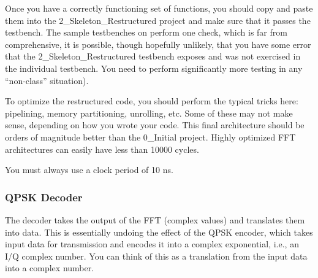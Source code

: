 \documentclass[a4paper,12pt,twoside]{article}
\begin{document}
Once you have a correctly functioning set of functions, you should copy and paste them into the 2\_Skeleton\_Restructured project and make sure that it passes the testbench. The sample testbenches on perform one check, which is far from comprehensive, it is possible, though hopefully unlikely, that you have some error that the 2\_Skeleton\_Restructured testbench exposes and was not exercised in the individual testbench. You need to perform significantly more testing in any “non-class” situation).

To optimize the restructured code, you should perform the typical tricks here: pipelining, memory partitioning, unrolling, etc. Some of these may not make sense, depending on how you wrote your code. This final architecture should be orders of magnitude better than the 0\_Initial project. Highly optimized FFT architectures can easily have less than 10000 cycles.

You must always use a clock period of 10 ns.
\subsubsection{QPSK Decoder}
The decoder takes the output of the FFT (complex values) and translates them into data. This is essentially undoing the effect of the QPSK encoder, which takes input data for transmission and encodes it into a complex exponential, i.e., an I/Q complex number. You can think of this as a translation from the input data into a complex number.
\end{document}
